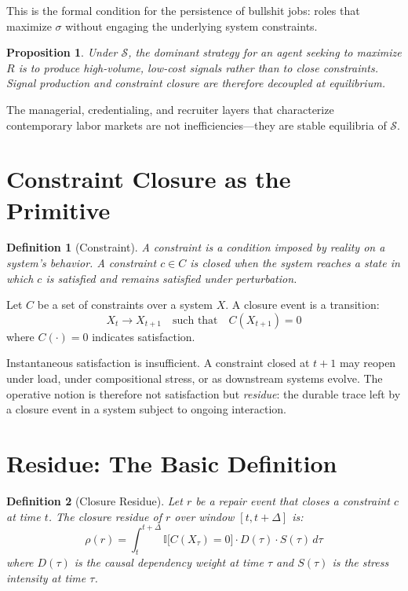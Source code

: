 \documentclass[12pt]{article}
\newtheorem{definition}{Definition}
\newtheorem{proposition}{Proposition}
\begin{document}
This is the formal condition for the persistence of bullshit jobs: roles
that maximize $\sigma$ without engaging the underlying system
constraints.

\begin{proposition}
Under $\mathcal{S}$, the dominant strategy for an agent seeking to
maximize $R$ is to produce high-volume, low-cost signals rather than to
close constraints. Signal production and constraint closure are therefore
decoupled at equilibrium.
\end{proposition}

The managerial, credentialing, and recruiter layers that characterize
contemporary labor markets are not inefficiencies---they are stable
equilibria of $\mathcal{S}$.

\section{Constraint Closure as the Primitive}

\begin{definition}[Constraint]
A \emph{constraint} is a condition imposed by reality on a system's
behavior. A constraint $c \in C$ is \emph{closed} when the system
reaches a state in which $c$ is satisfied and remains satisfied under
perturbation.
\end{definition}

Let $C$ be a set of constraints over a system $X$. A closure event is a
transition:
\[
  X_t \rightarrow X_{t+1} \quad \text{such that} \quad C(X_{t+1}) = 0
\]
where $C(\cdot) = 0$ indicates satisfaction.

Instantaneous satisfaction is insufficient. A constraint closed at
$t+1$ may reopen under load, under compositional stress, or as
downstream systems evolve. The operative notion is therefore not
satisfaction but \emph{residue}: the durable trace left by a closure
event in a system subject to ongoing interaction.

\section{Residue: The Basic Definition}

\begin{definition}[Closure Residue]
Let $r$ be a repair event that closes a constraint $c$ at time $t$.
The \emph{closure residue} of $r$ over window $[t, t+\Delta]$ is:
\[
  \rho(r) = \int_{t}^{t+\Delta}
    \mathbb{I}\bigl[C(X_\tau) = 0\bigr]
    \cdot D(\tau)
    \cdot S(\tau)
  \, d\tau
\]
where $D(\tau)$ is the causal dependency weight at time $\tau$ and
$S(\tau)$ is the stress intensity at time $\tau$.
\end{definition}
\end{document}
